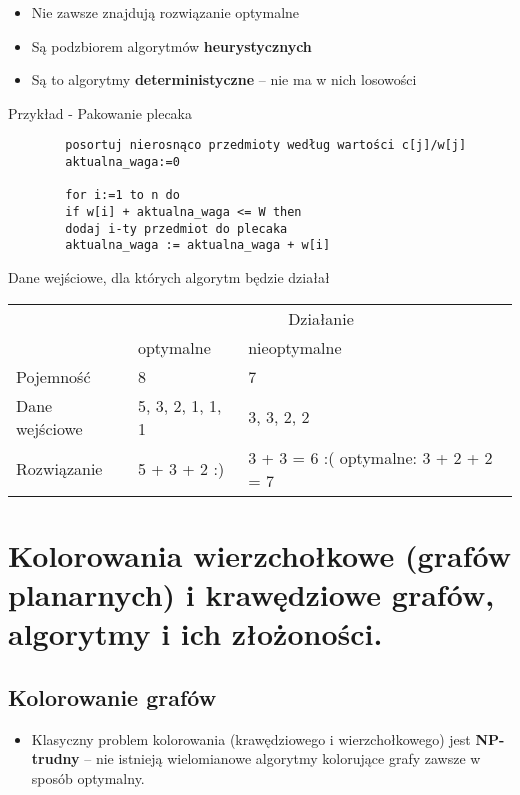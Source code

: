 \documentclass[main.tex]{subfiles}
\begin{document}
    \begin{itemize}[noitemsep]
        \item Nie zawsze znajdują rozwiązanie optymalne
        \item Są podzbiorem algorytmów \textbf{heurystycznych}
        \item Są to algorytmy \textbf{deterministyczne} – nie ma w nich losowości
    \end{itemize}

    Przykład - Pakowanie plecaka

    \begin{verbatim}
        posortuj nierosnąco przedmioty według wartości c[j]/w[j]
        aktualna_waga:=0

        for i:=1 to n do
        if w[i] + aktualna_waga <= W then
        dodaj i-ty przedmiot do plecaka
        aktualna_waga := aktualna_waga + w[i]
    \end{verbatim}

    Dane wejściowe, dla których algorytm będzie działał

    \begin{table}[H]
        \begin{center}
            \begin{tabular}{| p{5cm} | p{5cm}  | p{5cm}|}
                \hline
                &\multicolumn{2}{c|}{Działanie}\\
                &optymalne & nieoptymalne\\
                \hline
                \hline
                Pojemność & 8 & 7\\
                \hline
                Dane wejściowe & 5, 3, 2, 1, 1, 1 & 3, 3, 2, 2\\
                \hline
                Rozwiązanie & 5 + 3 + 2 :) & 3 + 3 = 6 :( \vskip 0mm optymalne: 3 + 2 + 2 = 7\\
                \hline
            \end{tabular}
        \end{center}
    \end{table}


    \section{Kolorowania wierzchołkowe (grafów planarnych) i krawędziowe grafów, algorytmy i ich złożoności.}

    \subsection{Kolorowanie grafów}
    \begin{itemize}
        \item Klasyczny problem kolorowania (krawędziowego i wierzchołkowego) jest \textbf{NP-trudny} – nie istnieją
        wielomianowe algorytmy kolorujące grafy zawsze w sposób optymalny.
    \end{itemize}
\end{document}

